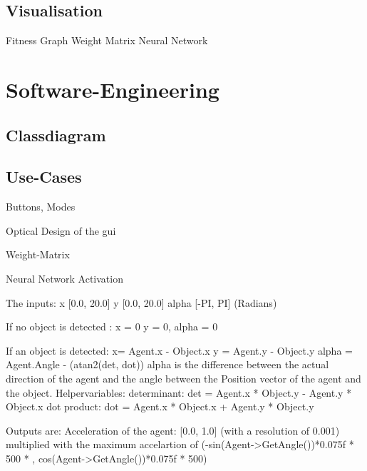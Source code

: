 \documentclass[10pt,a4paper,DIV=11]{scrreprt}
\begin{document}
\subsection{Visualisation}

Fitness Graph
Weight Matrix
Neural Network





\section{Software-Engineering}

\subsection{Classdiagram}

\subsection{Use-Cases}



Buttons, Modes

Optical Design of the gui

Weight-Matrix

Neural Network Activation


The inputs: 
x  [0.0, 20.0]
y   [0.0, 20.0]
alpha  [-PI, PI] (Radians)

If no object is detected :
x = 0
y = 0,
alpha = 0 

If an object is detected:
x= Agent.x - Object.x  
y = Agent.y - Object.y
alpha = Agent.Angle - (atan2(det, dot)) 
alpha is the difference between the actual direction of the agent and
the angle between the Position vector of the agent and the object. 
Helpervariables:
determinant: det =  Agent.x * Object.y - Agent.y * Object.x 
dot product:  dot =  Agent.x * Object.x + Agent.y * Object.y 


Outputs are:
Acceleration of the agent: [0.0, 1.0] (with a resolution of 0.001)
multiplied with the maximum accelartion of 
(-sin(Agent->GetAngle())*0.075f * 500 * ,  cos(Agent->GetAngle())*0.075f * 500)
\end{document}
